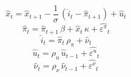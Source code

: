 \begin{dmath}
{\hat{x}_{t}}={\hat{x}_{t+1}}-\frac{1}{{\sigma}}\, \left({\hat{i}_{t}}-{\hat{\pi}_{t+1}}\right)+{\hat{u}_{t}}
\end{dmath}
\begin{dmath}
{\hat{\pi}_{t}}={\hat{\pi}_{t+1}}\, {\beta}+{\hat{x}_{t}}\, {\kappa}+{\hat{\varepsilon^{\pi}}_{t}}
\end{dmath}
\begin{dmath}
{\hat{i}_{t}}={\hat{\pi}_{t}}\, {\rho_{\pi}}+{\hat{\nu}_{t}}
\end{dmath}
\begin{dmath}
{\hat{u}_{t}}={\rho_u}\, {\hat{u}_{t-1}}+{\hat{\varepsilon^{u}}_{t}}
\end{dmath}
\begin{dmath}
{\hat{\nu}_{t}}={\rho_{\nu}}\, {\hat{\nu}_{t-1}}+{\hat{\varepsilon^{\nu}}_{t}}
\end{dmath}
